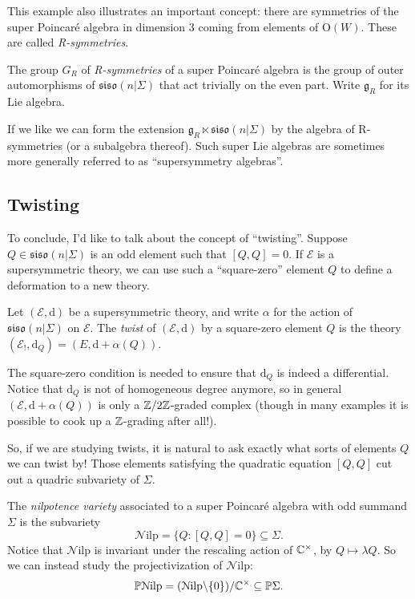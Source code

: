 This example also illustrates an important concept: there are symmetries of the super Poincar\'e algebra in dimension 3 coming from elements of $\mathrm O(W)$.  These are called \emph{R-symmetries}.

\begin{Definition}
	The group $G_R$ of \emph{R-symmetries} of a super Poincar\'e algebra is the group of outer automorphisms of $\mathfrak{siso}(n|\Sigma)$ that act trivially on the even part.  Write $\mathfrak{g}_R$ for its Lie algebra.
\end{Definition}

\begin{remark}
	If we like we can form the extension $\mathfrak{g}_R \ltimes \mathfrak{siso}(n|\Sigma)$ by the algebra of R-symmetries (or a subalgebra thereof).  Such super Lie algebras are sometimes more generally referred to as ``supersymmetry algebras''.
\end{remark}

\subsection{Twisting}
To conclude, I'd like to talk about the concept of ``twisting''.  Suppose $Q \in \mathfrak{siso}(n|\Sigma)$ is an odd element such that $[Q,Q]=0$.  If $\mathcal E$ is a supersymmetric theory, we can use such a ``square-zero'' element $Q$ to define a deformation to a new theory.
\begin{Definition}
	Let $(\mathcal E,\mathrm{d})$ be a supersymmetric theory, and write $\alpha$ for the action of $\mathfrak{siso}(n|\Sigma)$ on $\mathcal E$.  The \emph{twist} of $(\mathcal E,\mathrm{d})$ by a square-zero element $Q$ is the theory $(\mathcal E_!,\mathrm{d}_Q) = (E, \mathrm{d} + \alpha(Q))$.
\end{Definition}
The square-zero condition is needed to ensure that $\mathrm{d}_Q$ is indeed a differential.  Notice that $\mathrm{d}_Q$ is not of homogeneous degree anymore, so in general $(\mathcal E, \mathrm{d} + \alpha(Q))$ is only a $\mathbb{Z}/2\mathbb{Z}$-graded complex (though in many examples it is possible to cook up a $\mathbb{Z}$-grading after all!).

So, if we are studying twists, it is natural to ask exactly what sorts of elements $Q$ we can twist by!  Those elements satisfying the quadratic equation $[Q,Q]$ cut out a quadric subvariety of $\Sigma$.
\begin{Definition}
	The \emph{nilpotence variety} associated to a super Poincar\'e algebra with odd summand $\Sigma$ is the subvariety
	\[\mathcal N\mathrm{ilp} = \{Q \colon [Q,Q] = 0\} \subseteq\Sigma.\]
	Notice that $\mathcal N\mathrm{ilp}$ is invariant under the rescaling action of $\mathbb{C}^\times$, by $Q \mapsto \lambda Q$.  So we can instead study the projectivization of $\mathcal N\mathrm{ilp}$:
	\[\mathbb P \mathcal N \mathrm{ilp}= (\mathcal N\mathrm{ilp} \backslash \{0\})/\mathbb{C}^\times \subseteq\mathbb P \Sigma.\]
\end{Definition}


